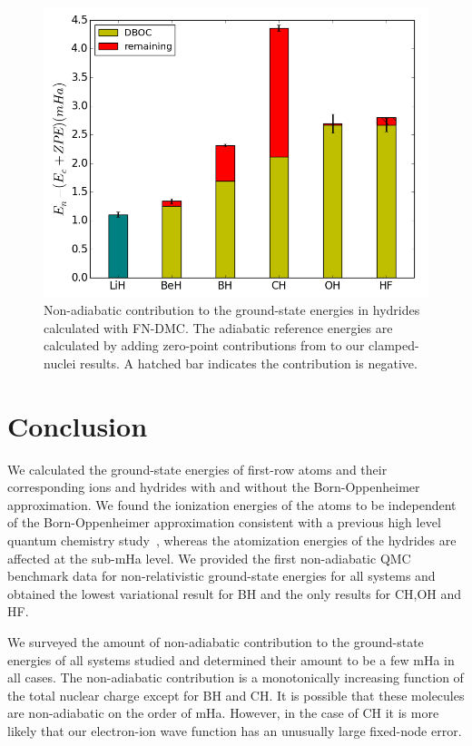 \documentclass[pra,superscriptaddress,groupedaddress,twocolumn]{revtex4}
\begin{document}
\begin{figure}[h]
\includegraphics[scale=.37]{Figures/dia-nad-ad}
\caption{Non-adiabatic contribution to the ground-state energies in hydrides calculated with FN-DMC. The adiabatic reference energies are calculated by adding zero-point contributions from \cite{Feller_Corrections} to our clamped-nuclei results. A hatched bar indicates the contribution is negative. \label{fig:dia-nad-ad}}
\end{figure}

\section{Conclusion}
We calculated the ground-state energies of first-row atoms and their corresponding ions and hydrides with and without the Born-Oppenheimer approximation. We found the ionization energies of the atoms to be independent of the Born-Oppenheimer approximation consistent with a previous high level quantum chemistry study~\cite{Klopper_IP}, whereas the atomization energies of the hydrides are affected at the sub-mHa level. We provided the first non-adiabatic QMC benchmark data for non-relativistic ground-state energies for all systems and obtained the lowest variational result for BH and the only results for CH,OH and HF.

We surveyed the amount of non-adiabatic contribution to the ground-state energies of all systems studied and determined their amount to be a few mHa in all cases. The non-adiabatic contribution is a monotonically increasing function of the total nuclear charge except for BH and CH. It is possible that these molecules are non-adiabatic on the order of mHa. However, in the case of CH it is more likely that our electron-ion wave function has an unusually large fixed-node error.
\end{document}

